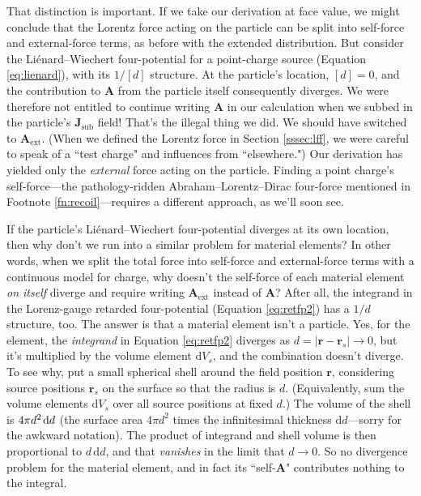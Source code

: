 \documentclass[12pt]{article}
\renewcommand{\vv}[1]{\mathbf{#1}}
\newcommand{\dd}[1]{\mathrm{d}#1}
\begin{document}
That distinction is important. If we take our derivation at face value, we might conclude that the Lorentz force acting on the particle can be split into self-force and external-force terms, as before with the extended distribution. But consider the Li\'enard--Wiechert four-potential for a point-charge source (Equation \ref{eq:lienard}), with its $1/[d]$ structure. At the particle's location, $[d] = 0$, and the contribution to $\vv A$ from the particle itself consequently diverges. We were therefore not entitled to continue writing $\vv A$ in our calculation when we subbed in the particle's $\vv J_{\textrm{sub}}$ field! That's the illegal thing we did. We should have switched to $\vv A_{\mathrm{ext}}$. (When we defined the Lorentz force in Section \ref{sssec:lff}, we were careful to speak of a ``test charge" and influences from ``elsewhere.") Our derivation has yielded only the \emph{external} force acting on the particle. Finding a point charge's self-force---the pathology-ridden Abraham--Lorentz--Dirac four-force mentioned in Footnote \ref{fn:recoil}---requires a different approach, as we'll soon see.

If the particle's Li\'enard--Wiechert four-potential diverges at its own location, then why don't we run into a similar problem for material elements? In other words, when we split the total force into self-force and external-force terms with a continuous model for charge, why doesn't the self-force of each material element \emph{on itself} diverge and require writing $\vv A_{\mathrm{ext}}$ instead of $\vv A$? After all, the integrand in the Lorenz-gauge retarded four-potential (Equation \ref{eq:retfp2}) has a $1/d$ structure, too. The answer is that a material element isn't a particle. Yes, for the element, the \emph{integrand} in Equation \ref{eq:retfp2} diverges as $d = \vert \vv r - \vv r_s \vert \to 0$, but it's multiplied by the volume element $\dd V_s$, and the combination doesn't diverge. To see why, put a small spherical shell around the field position $\vv r$, considering source positions $\vv r_s$ on the surface so that the radius is $d$. (Equivalently, sum the volume elements $\dd V_s$ over all source positions at fixed $d$.) The volume of the shell is $4 \pi d^2 \mkern2mu \dd d$ (the surface area $4 \pi d^2$ times the infinitesimal thickness $\dd d$---sorry for the awkward notation). The product of integrand and shell volume is then proportional to $d \, \dd d$, and that \emph{vanishes} in the limit that $d \to 0$. So no divergence problem for the material element, and in fact its ``self-$\vv A$" contributes nothing to the integral.
\end{document}
